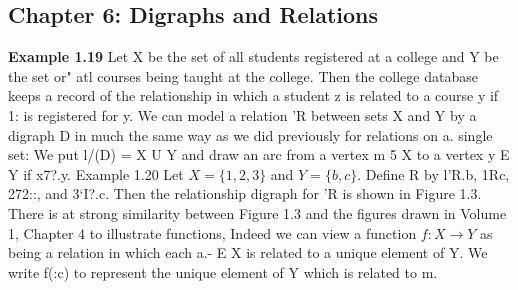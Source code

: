 ﻿\documentclass[]{article}
\begin{document}
\subsection*{Chapter 6: Digraphs and Relations}
\textbf{Example 1.19} Let X be the set of all students registered at a college and Y be
the set or" atl courses being taught at the college. Then the college database keeps
a record of the relationship in which a student z is related to a course y if 1: is
registered for y.
We can model a relation 'R between sets X and Y by a digraph D in much the
same way as we did previously for relations on a. single set: We put l/(D) = X U Y
and draw an arc from a vertex m 5 X to a vertex y E Y if x7?.y.
Example 1.20 Let $X = \{1, 2,3\}$ and $Y = \{b, c\}$. Define R by l’R.b, 1Rc, 272::, and
3‘I?.c. Then the relationship digraph for 'R is shown in Figure 1.3.
There is at strong similarity between Figure 1.3 and the figures drawn in Volume
1, Chapter 4 to illustrate functions, Indeed we can view a function $f : X \rightarrow Y$ as
being a relation in which each a.- E X is related to a unique element of Y. We write
f(:c) to represent the unique element of Y which is related to m.
\end{document}
